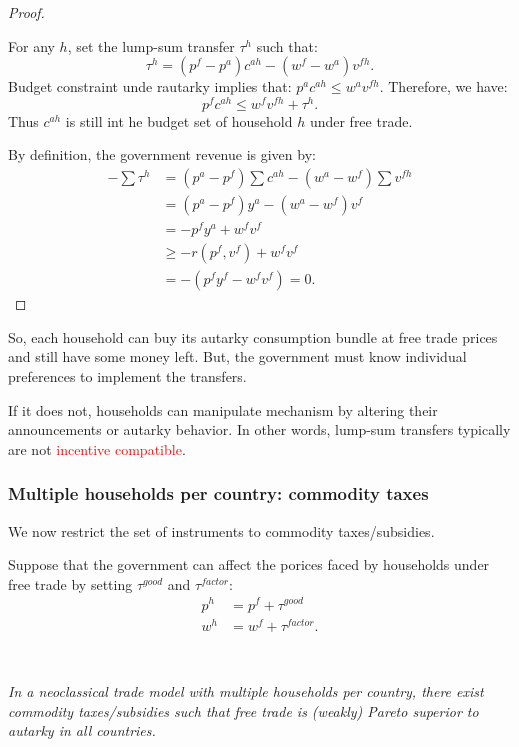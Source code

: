 \begin{proof}
    \

    For any $h$, set the lump-sum transfer $\tau^h$ such that:
    \[\tau ^h = (p^f - p^a)c^{ah} - (w^f - w^a)v^{fh}.\]
    Budget constraint unde rautarky implies that: $p^a c^{ah} \leq w^a v^{fh}. $
    Therefore, we have:
    \[p^f c^{ah} \leq w^f v^{fh} + \tau ^h.\]
    Thus $c^{ah} $ is still int he budget set of household $h$ under free trade.
    
    By definition, the government revenue is given by:
    \begin{align*}
        - \sum \tau ^h &= (p^a - p^f) \sum c^{ah} - (w^a - w^f) \sum v^{fh} \\
        &= (p^a - p^f) y^a - (w^a - w^f) v^f \\
        &= -p^f y^a + w^f v^f \\
        & \geq -r(p^f, v^f) + w^f v^f \\
        &= -(p^f y^f - w^f v^f) = 0.
    \end{align*}
\end{proof}

So, each household can buy its autarky consumption bundle at free trade prices and still have some money left.
But, the government must know individual preferences to implement the transfers.

If it does not, households can manipulate mechanism by altering their announcements or
autarky behavior. In other words, lump-sum transfers typically are
not \textcolor{red}{incentive compatible}.

\subsubsection{Multiple households per country: commodity taxes}
We now restrict the set of instruments to commodity taxes/subsidies.

Suppose that the government can affect the porices faced by households under free trade
by setting $\tau ^{good}$ and $\tau ^{factor}$:
\begin{align*}
    p^h &= p^f + \tau ^{good} \\
    w^h &= w^f + \tau ^{factor}.
\end{align*}

\begin{proposition}\label{prop:3}
    \

    \textit{In a neoclassical trade model with multiple households
    per country, there exist commodity taxes/subsidies such that free
    trade is (weakly) Pareto superior to autarky in all countries.}
\end{proposition}

